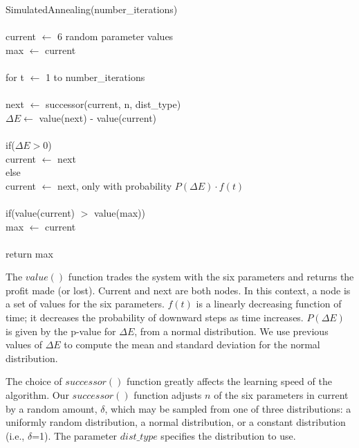 \documentclass[12pt]{article}
\begin{document}
\vspace{25pt}
\setlength{\parindent}{5mm}
\indent SimulatedAnnealing(number\_iterations)\\\\
\indent \indent current $\leftarrow$ 6 random parameter values\\
\indent \indent max $\leftarrow$ current\\\\
\indent \indent for t $\leftarrow$ 1 to number\_iterations\\\\
\indent \indent \indent next $\leftarrow$ successor(current, n, dist\_type)\\
\indent \indent \indent $\Delta E \leftarrow$ value(next) - value(current)\\\\
\indent \indent \indent if($\Delta E > 0$)\\
\indent \indent \indent \indent current $\leftarrow$ next\\
\indent \indent \indent else\\
\indent \indent \indent \indent current $\leftarrow$ next, only with probability $P(\Delta E) \cdot f(t)$\\\\
\indent \indent \indent if(value(current) $>$ value(max))\\
\indent \indent \indent \indent max $\leftarrow$ current\\\\
\indent \indent return max\\
\setlength{\parindent}{0mm}

\pagebreak
The $value()$ function trades the system with the six parameters and returns the
profit made (or lost).  Current and next are both nodes.  In this context, a
node is a set of values for the six parameters. $f(t)$ is a linearly decreasing
function of time; it decreases the probability of downward steps as time
increases. $P(\Delta E)$ is given by the p-value for $\Delta E$, from a normal
distribution.  We use previous values of $\Delta E$ to compute the mean and
standard deviation for the normal distribution.

The choice of $successor()$ function greatly affects the learning speed of the
algorithm.  Our $successor()$ function adjusts $n$ of the six parameters in
current by a random amount, $\delta$, which may be sampled from one of three
distributions: a uniformly random distribution, a normal distribution, or a
constant distribution (i.e., $\delta$=1).  The parameter $dist\_type$ specifies
the distribution to use.
\end{document}
